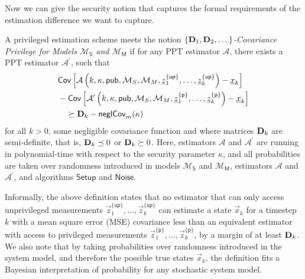 Now we can give the security notion that captures the formal requirements of the estimation difference we want to capture.
\begin{definition}\label{def:priv_estimation:covariance_privilege_notion}
    A privileged estimation scheme meets the notion \textit{$\{{{\mathbf{D}}}_1,{{\mathbf{D}}}_2,\dots\}$-Covariance Privilege for Models $\mathcal{M}_{\mathsf{S}}$ and $\mathcal{M}_{\mathsf{M}}$} if for any PPT estimator $\mathcal{A}$, there exists a PPT estimator $\mathcal{A}^\prime$, such that
    \begin{equation}\label{eq:priv_estimation:covariance_privilege}
        \begin{split}
            &\mathsf{Cov}\left[\mathcal{A}\left(k, \kappa, \mathsf{pub}, \mathcal{M}_S, \mathcal{M}_M, {\underline{z}}_1^{\{\mathsf{up}\}},\dots,{\underline{z}}_k^{\{\mathsf{up}\}}\right) - {\underline{x}}_k \right]\\
            &-\mathsf{Cov}\left[\mathcal{A}^\prime\left(k, \kappa, \mathsf{pub}, \mathcal{M}_S, \mathcal{M}_M, {\underline{z}}_1^{\{\mathsf{p}\}},\dots,{\underline{z}}_k^{\{\mathsf{p}\}}\right) - {\underline{x}}_k \right]\\
            &\quad\succeq {\ensuremath{{\mathbf{D}}}}_k - \mathsf{neglCov}_m(\kappa)
        \end{split}
    \end{equation}
   for all $k>0$, some negligible covariance function and where matrices ${{\mathbf{D}}}_k$ are semi-definite, that is, ${{\mathbf{D}}}_k\preceq 0$ or ${{\mathbf{D}}}_k\succeq 0$. Here, estimators $\mathcal{A}$ and $\mathcal{A}^\prime$ are running in polynomial-time with respect to the security parameter $\kappa$, and all probabilities are taken over randomness introduced in models $\mathcal{M}_{\mathsf{S}}$ and $\mathcal{M}_{\mathsf{M}}$, estimators $\mathcal{A}$ and $\mathcal{A}^\prime$, and algorithms $\mathsf{Setup}$ and $\mathsf{Noise}$.
\end{definition}

Informally, the above definition states that no estimator that can only access unprivileged measurements $\vec{z}_1^{\{\mathsf{up}\}},\dots,\vec{z}_k^{\{\mathsf{up}\}}$ can estimate a state $\vec{x}_k$ for a timestep $k$ with a mean square error (MSE) covariance less than an equivalent estimator with access to privileged measurements $\vec{z}_1^{\{\mathsf{p}\}},\dots,\vec{z}_k^{\{\mathsf{p}\}}$, by a margin of at least ${{\mathbf{D}}}_k$. We also note that by taking probabilities over randomness introduced in the system model, and therefore the possible true states $\vec{x}_k$, the definition fits a Bayesian interpretation of probability for any stochastic system model.

